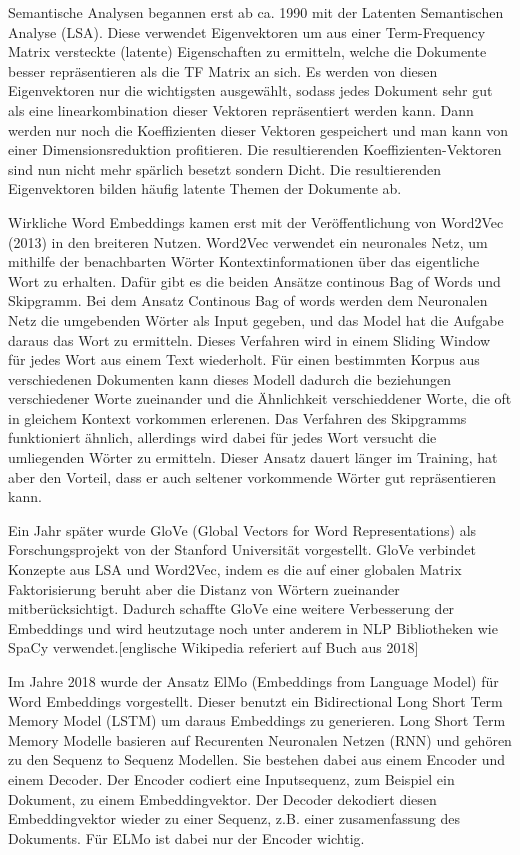 Semantische Analysen begannen erst ab ca. 1990 mit der Latenten Semantischen Analyse (LSA).
Diese verwendet Eigenvektoren um aus einer Term-Frequency Matrix versteckte (latente) Eigenschaften zu ermitteln, welche die Dokumente besser repräsentieren als die TF Matrix an sich. 
Es werden von diesen Eigenvektoren nur die wichtigsten ausgewählt, sodass jedes Dokument sehr gut als eine linearkombination dieser Vektoren repräsentiert werden kann.
Dann werden nur noch die Koeffizienten dieser Vektoren gespeichert und man kann von einer Dimensionsreduktion profitieren.
Die resultierenden Koeffizienten-Vektoren sind nun nicht mehr spärlich besetzt sondern Dicht.
Die resultierenden Eigenvektoren bilden häufig latente Themen der Dokumente ab.

Wirkliche Word Embeddings kamen erst mit der Veröffentlichung von Word2Vec (2013) in den breiteren Nutzen. 
Word2Vec verwendet ein neuronales Netz, um mithilfe der benachbarten Wörter Kontextinformationen über das eigentliche Wort zu erhalten. 
Dafür gibt es die beiden Ansätze continous Bag of Words und Skipgramm.
Bei dem Ansatz Continous Bag of words werden dem Neuronalen Netz die umgebenden Wörter als Input gegeben, und das Model hat die Aufgabe daraus das Wort zu ermitteln. 
Dieses Verfahren wird in einem Sliding Window für jedes Wort aus einem Text wiederholt. 
Für einen bestimmten Korpus aus verschiedenen Dokumenten kann dieses Modell dadurch die beziehungen verschiedener Worte zueinander und die Ähnlichkeit verschieddener Worte, die oft in gleichem Kontext vorkommen erlerenen. 
Das Verfahren des Skipgramms funktioniert ähnlich, allerdings wird dabei für jedes Wort versucht die umliegenden Wörter zu ermitteln. 
Dieser Ansatz dauert länger im Training, hat aber den Vorteil, dass er auch seltener vorkommende Wörter gut repräsentieren kann.

Ein Jahr später wurde GloVe (Global Vectors for Word Representations) als Forschungsprojekt von der Stanford Universität vorgestellt. 
GloVe verbindet Konzepte aus LSA und Word2Vec, indem es die auf einer globalen Matrix Faktorisierung beruht aber die Distanz von Wörtern zueinander mitberücksichtigt.
Dadurch schaffte GloVe eine weitere Verbesserung der Embeddings und wird heutzutage noch unter anderem in NLP Bibliotheken wie SpaCy verwendet.[englische Wikipedia referiert auf Buch aus 2018]

Im Jahre 2018 wurde der Ansatz ElMo (Embeddings from Language Model) für Word Embeddings vorgestellt.
Dieser benutzt ein Bidirectional Long Short Term Memory Model (LSTM) um daraus Embeddings zu generieren.
Long Short Term Memory Modelle basieren auf Recurenten Neuronalen Netzen (RNN) und gehören zu den Sequenz to Sequenz Modellen. 
Sie bestehen dabei aus einem Encoder und einem Decoder.
Der Encoder codiert eine Inputsequenz, zum Beispiel ein Dokument, zu einem Embeddingvektor. 
Der Decoder dekodiert diesen Embeddingvektor wieder zu einer Sequenz, z.B. einer zusamenfassung des Dokuments.
Für ELMo ist dabei nur der Encoder wichtig.










